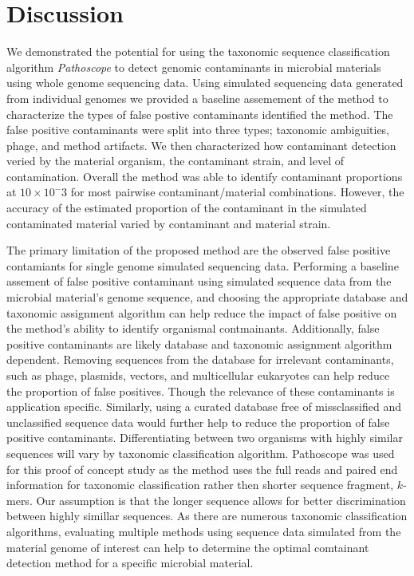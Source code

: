 \documentclass[fleqn,10pt,lineno]{wlpeerj}\usepackage[]{graphicx}\usepackage[]{color}
\begin{document}
\section*{Discussion}

We demonstrated the potential for using the taxonomic sequence classification algorithm \textit{Pathoscope} to detect genomic contaminants in microbial materials using whole genome sequencing data. 
Using simulated sequencing data generated from individual genomes we provided a baseline assemement of the method to characterize the types of false postive contaminants identified the method. 
The false positive contaminants were split into three types; taxonomic ambiguities, phage, and method artifacts. 
We then characterized how contaminant detection veried by the material organism, the contaminant strain, and level of contamination. 
Overall the method was able to identify contaminant proportions at $10 \times 10^-3$ for most pairwise contaminant/material combinations. 
However, the accuracy of the estimated proportion of the contaminant in the simulated contaminated material varied by contaminant and material strain. 

The primary limitation of the proposed method are the observed false positive contamiants for single genome simulated sequencing data. 
Performing a baseline assement of false positive contaminant using simulated sequence data from the microbial material's genome sequence, and choosing the appropriate database and taxonomic assignment algorithm can help reduce the impact of false positive on the method's ability to identify organismal contmainants. 
Additionally, false positive contaminants are likely database and taxonomic assignment algorithm dependent. 
Removing sequences from the database for irrelevant contaminants, such as phage, plasmids, vectors, and multicellular eukaryotes can help reduce the proportion of false positives. 
Though the relevance of these contaminants is application specific. 
Similarly, using a curated database free of missclassified and unclassified sequence data would further help to reduce the proportion of false positive contaminants. 
Differentiating between two organisms with highly similar sequences will vary by taxonomic classification algorithm. 
Pathoscope was used for this proof of concept study as the method uses the full reads and paired end information for taxonomic classification rather then shorter sequence fragment, $k$-mers. 
Our assumption is that the longer sequence allows for better discrimination between highly simillar sequences. 
As there are numerous taxonomic classification algorithms, evaluating multiple methods using sequence data simulated from the material genome of interest can help to determine the optimal comtainant detection method for a specific microbial material. 
\end{document}
